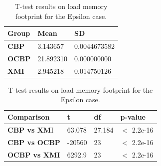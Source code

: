 \documentclass{llncs}
\begin{document}
\begin{table}[ht]
    \centering
    \label{table:ttest_load_memory_epsilon}
    \caption{T-test results on load memory footprint for the Epsilon case.}
    \begin{minipage}{0.44\textwidth}
        \centering
        \begin{tabular}{|p{}|p{}|p{}|}
            \hline 
            \textbf{Group}  & \textbf{Mean} & \textbf{SD} \\ 
            \hline 
            \textbf{CBP} & 3.143657     &0.0044673582 \\ 
            \hline 
            \textbf{OCBP} & 21.892310  & 0.000000000 \\ 
            \hline 
            \textbf{XMI} & 2.945218   &0.014750126 \\ 
            \hline 
        \end{tabular} 
    \end{minipage}
    \hfill
    \begin{minipage}{0.54\textwidth}
        \centering
        \begin{tabular}{|p{}|p{}|p{}|p{}|}
            \hline 
            \textbf{Comparison} & \textbf{t}  & \textbf{df} & \textbf{p-value} \\ 
            \hline 
            \textbf{CBP vs XM}I &63.078  &27.184 & $<$ 2.2e-16 \\ 
            \hline 
            \textbf{CBP vs OCBP} & -20560 & 23 & $<$ 2.2e-16 \\ 
            \hline 
            \textbf{OCBP vs XMI} & 6292.9   &23   & $<$ 2.2e-16 \\ 
            \hline 
        \end{tabular} 
    \end{minipage}
\end{table}
\end{document}
